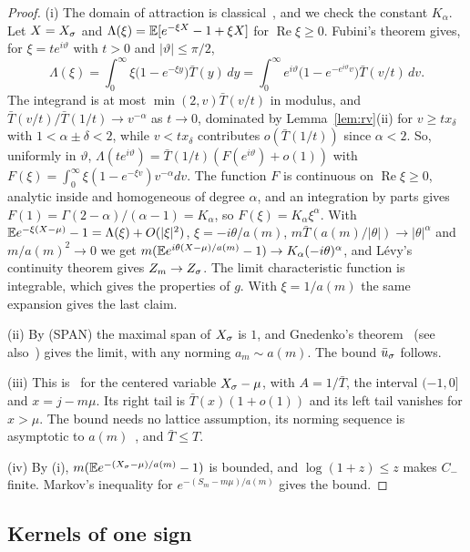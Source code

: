 \begin{proof}
(i) The domain of attraction is classical~\cite[Section~XVII.5]{feller1971}, and we
check the constant $K_\alpha$. Let $X=X_\sigma$ and
$\Lambda(\xi)=\mathbb{E}[e^{-\xi X}-1+\xi X]$ for $\operatorname{Re}\xi\ge0$. Fubini's theorem gives,
for $\xi=te^{i\vartheta}$ with $t>0$ and $|\vartheta|\le\pi/2$,
\[
 \Lambda(\xi)=\int_0^\infty \xi\bigl(1-e^{-\xi y}\bigr)\bar T(y)\,dy
 =\int_0^\infty e^{i\vartheta}\bigl(1-e^{-e^{i\vartheta}v}\bigr)\bar T(v/t)\,dv .
\]
The integrand is at most $\min(2,v)\bar T(v/t)$ in modulus, and
$\bar T(v/t)/\bar T(1/t)\to v^{-\alpha}$ as $t\to0$, dominated by
Lemma~\ref{lem:rv}(ii) for $v\ge tx_\delta$ with $1<\alpha\pm\delta<2$, while
$v<tx_\delta$ contributes $o(\bar T(1/t))$ since $\alpha<2$. So, uniformly in
$\vartheta$, $\Lambda(te^{i\vartheta})=\bar T(1/t)(F(e^{i\vartheta})+o(1))$ with
$F(\xi)=\int_0^\infty\xi(1-e^{-\xi v})v^{-\alpha}dv$. The function $F$ is continuous on
$\operatorname{Re}\xi\ge0$, analytic inside and homogeneous of degree $\alpha$, and an
integration by parts gives $F(1)=\Gamma(2-\alpha)/(\alpha-1)=K_\alpha$, so
$F(\xi)=K_\alpha\xi^\alpha$. With $\mathbb{E} e^{-\xi(X-\mu)}-1=\Lambda(\xi)+O(|\xi|^2)$,
$\xi=-i\theta/a(m)$, $m\bar T(a(m)/|\theta|)\to|\theta|^\alpha$ and $m/a(m)^2\to0$ we get
$m(\mathbb{E} e^{i\theta(X-\mu)/a(m)}-1)\to K_\alpha(-i\theta)^\alpha$, and L\'evy's continuity
theorem gives $Z_m\to Z_\sigma$. The limit characteristic function is integrable, which
gives the properties of $g$. With $\xi=1/a(m)$ the same expansion gives the last claim.

(ii) By (SPAN) the maximal span of $X_\sigma$ is $1$, and Gnedenko's
theorem~\cite[Theorem~4.2.1]{ibragimovlinnik1971} (see also~\cite[Theorem~8.4.1]{bgt1989})
gives the limit, with any norming $a_m\sim a(m)$. The bound $\bar u_\sigma$ follows.

(iii) This is~\cite[Theorem~1.1, bound~(1.6)]{caravennadoney2019} for the centered
variable $X_\sigma-\mu$, with $A=1/\bar T$, the interval $(-1,0]$ and $x=j-m\mu$. Its
right tail is $\bar T(x)(1+o(1))$ and its left tail vanishes for $x>\mu$. The bound
needs no lattice assumption, its norming sequence is asymptotic to
$a(m)$~\cite[Theorem~1.5.12]{bgt1989}, and $\bar T\le T$.

(iv) By (i), $m(\mathbb{E} e^{-(X_\sigma-\mu)/a(m)}-1)$ is bounded, and $\log(1+z)\le z$ makes $C_-$
finite. Markov's inequality for $e^{-(S_m-m\mu)/a(m)}$ gives the bound.
\end{proof}

\subsection{Kernels of one sign}\label{sec:bulk-kernels}

